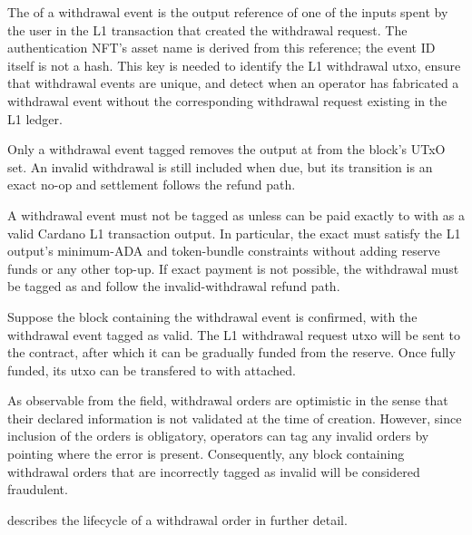 \documentclass[../midgard.tex]{subfiles}
\begin{document}
The  of a withdrawal event is the output reference of one of the inputs spent by the user in the L1 transaction that created the withdrawal request.
The authentication NFT's asset name is derived from this reference; the event ID itself is not a hash.
This key is needed to identify the L1 withdrawal utxo, ensure that withdrawal events are unique, and detect when an operator has fabricated a withdrawal event without the corresponding withdrawal request existing in the L1 ledger.

Only a withdrawal event tagged  removes the output at  from the block's UTxO set.
An invalid withdrawal is still included when due, but its transition is an exact no-op and settlement follows the refund path.

A withdrawal event must not be tagged as  unless  can be paid exactly to  with  as a valid Cardano L1 transaction output.
In particular, the exact  must satisfy the L1 output's minimum-ADA and token-bundle constraints without adding reserve funds or any other top-up.
If exact payment is not possible, the withdrawal must be tagged as  and follow the invalid-withdrawal refund path.

Suppose the block containing the withdrawal event is confirmed, with the withdrawal event tagged as valid.
The L1 withdrawal request utxo will be sent to the  contract, after which it can be gradually funded from the reserve.
Once fully funded, its utxo can be transfered to  with  attached.

As observable from the  field, withdrawal orders are optimistic in the sense that their declared information is not validated at the time of creation.
However, since inclusion of the orders is obligatory, operators can tag any invalid orders by pointing where the error is present.
Consequently, any block containing withdrawal orders that are incorrectly tagged as invalid will be considered fraudulent.

 describes the lifecycle of a withdrawal order in further detail.
\end{document}
